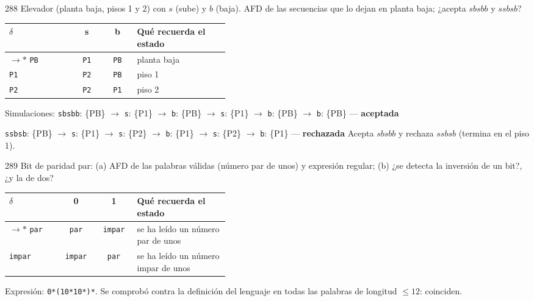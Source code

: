 \documentclass[11pt]{article}
\begin{document}
\begin{ejercicio}{288}{}
Elevador (planta baja, pisos 1 y 2) con $s$ (sube) y $b$ (baja). AFD de las secuencias que lo dejan en planta baja; ¿acepta $sbsbb$ y $ssbsb$?
\end{ejercicio}
\proc \begin{center}\small\begin{tabular}{lccp{0.42\linewidth}}\toprule
$\delta$ & s & b & Qué recuerda el estado \\\midrule
$\to$$*$ \texttt{PB} & \texttt{P1} & \texttt{PB} & planta baja \\
 \texttt{P1} & \texttt{P2} & \texttt{PB} & piso 1 \\
 \texttt{P2} & \texttt{P2} & \texttt{P1} & piso 2 \\
\bottomrule\end{tabular}\end{center}
Simulaciones: \texttt{sbsbb}: \{PB\} $\to$ \texttt{s}: \{P1\} $\to$ \texttt{b}: \{PB\} $\to$ \texttt{s}: \{P1\} $\to$ \texttt{b}: \{PB\} $\to$ \texttt{b}: \{PB\} — \textbf{aceptada}\par \texttt{ssbsb}: \{PB\} $\to$ \texttt{s}: \{P1\} $\to$ \texttt{s}: \{P2\} $\to$ \texttt{b}: \{P1\} $\to$ \texttt{s}: \{P2\} $\to$ \texttt{b}: \{P1\} — \textbf{rechazada}
\resp Acepta $sbsbb$ y rechaza $ssbsb$ (termina en el piso 1).


\begin{ejercicio}{289}{}
Bit de paridad par: (a) AFD de las palabras válidas (número par de unos) y expresión regular; (b) ¿se detecta la inversión de un bit?, ¿y la de dos?
\end{ejercicio}
\proc \begin{center}\small\begin{tabular}{lccp{0.42\linewidth}}\toprule
$\delta$ & 0 & 1 & Qué recuerda el estado \\\midrule
$\to$$*$ \texttt{par} & \texttt{par} & \texttt{impar} & se ha leído un número par de unos \\
 \texttt{impar} & \texttt{impar} & \texttt{par} & se ha leído un número impar de unos \\
\bottomrule\end{tabular}\end{center}
\par Expresión: \texttt{0*(10*10*)*}. Se comprobó contra la definición del lenguaje en todas las palabras de longitud $\le 12$: coinciden.
\end{document}
